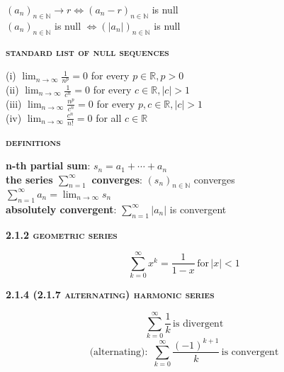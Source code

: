 \documentclass[a4paper]{article}
\begin{document}
\begin{multicols}{2}
\begin{framed}
	\noindent
	$(a_n)_{n\in \mathbb{N}} \rightarrow r \iff (a_n - r)_{n\in \mathbb{N}}$ is null\\
	$(a_n)_{n\in \mathbb{N}}$ is null $\iff (\vert a_n \vert)_{n\in \mathbb{N}}$ is null
\end{framed}

\begin{framed}
	\begin{center}
		\textbf{\textsc{standard list of null sequences}}
	\end{center}
	(i) $\lim_{n \rightarrow \infty}\frac{1}{n^p} = 0$ for every $p \in \mathbb{R}, p > 0$\\
	(ii) $\lim_{n \rightarrow \infty}\frac{1}{c^n} = 0$ for every $c \in \mathbb{R}, \vert c \vert > 1$\\
	(iii) $\lim_{n \rightarrow \infty}\frac{n^p}{c^n} = 0$ for every $p, c \in \mathbb{R}, \vert c \vert > 1$\\
	(iv) $\lim_{n \rightarrow \infty}\frac{c^n}{n!} = 0$ for all $c \in \mathbb{R}$
\end{framed}

\newpage
\begin{framed}
	\begin{center}
		\textbf{\textsc{definitions}}
	\end{center}
	\textbf{n-th partial sum}: $s_n = a_1 + \cdots + a_n$\\
	\textbf{the series $\sum^\infty_{n=1}$ converges}: $(s_n)_{n \in \mathbb{N}}$ converges\\
	\textbf{$\sum^\infty_{n=1} a_n = \lim_{n \rightarrow \infty} s_n$}\\
	\textbf{absolutely convergent}: $\sum^\infty_{n=1} \vert a_n \vert$ is convergent
\end{framed}

\begin{framed}
	\begin{center}
		\textbf{\textsc{2.1.2 geometric series}}
	\end{center}
	$$\sum^\infty_{k=0} x^k = \frac{1}{1-x} \, \text{for} \, \vert x \vert < 1$$
\end{framed}

\begin{framed}
	\begin{center}
		\textbf{\textsc{2.1.4 (2.1.7 alternating) harmonic series}}
	\end{center}
	$$\sum^\infty_{k=0} \frac{1}{k} \, \text{is divergent}$$
	$$\text{(alternating): } \, \sum^\infty_{k=0} \frac{(-1)^{k+1}}{k} \, \text{is convergent}$$
\end{framed}


\end{multicols}
\end{document}
